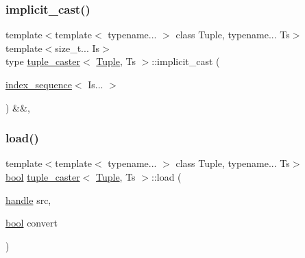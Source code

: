 \mbox{\label{classtuple__caster_a3101ab61e84c97fd09104355e095b491}} 
\subsubsection{\texorpdfstring{implicit\_cast()}{implicit\_cast()}\hspace{0.1cm}{\footnotesize\ttfamily [2/2]}}
{\footnotesize\ttfamily template$<$template$<$ typename... $>$ class Tuple, typename... Ts$>$ \\
template$<$size\+\_\+t... Is$>$ \\
type \mbox{\hyperlink{classtuple__caster}{tuple\+\_\+caster}}$<$ \mbox{\hyperlink{_python-ast_8h_a3f332c0be139cb870e516bad9b6a9366}{Tuple}}, Ts $>$\+::implicit\+\_\+cast (\begin{DoxyParamCaption}\item[{\mbox{\hyperlink{structindex__sequence}{index\+\_\+sequence}}$<$ Is... $>$}]{ }\end{DoxyParamCaption}) \&\&\hspace{0.3cm}{\ttfamily [inline]}, {\ttfamily [protected]}}

\mbox{\label{classtuple__caster_a5068d29ae84a185fbc5e942c17709096}} 
\subsubsection{\texorpdfstring{load()}{load()}}
{\footnotesize\ttfamily template$<$template$<$ typename... $>$ class Tuple, typename... Ts$>$ \\
\mbox{\hyperlink{asdl_8h_af6a258d8f3ee5206d682d799316314b1}{bool}} \mbox{\hyperlink{classtuple__caster}{tuple\+\_\+caster}}$<$ \mbox{\hyperlink{_python-ast_8h_a3f332c0be139cb870e516bad9b6a9366}{Tuple}}, Ts $>$\+::load (\begin{DoxyParamCaption}\item[{\mbox{\hyperlink{classhandle}{handle}}}]{src,  }\item[{\mbox{\hyperlink{asdl_8h_af6a258d8f3ee5206d682d799316314b1}{bool}}}]{convert }\end{DoxyParamCaption})\hspace{0.3cm}{\ttfamily [inline]}}

